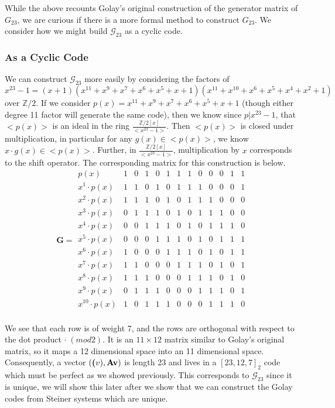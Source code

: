 \documentclass[paper=a4, fontsize=11pt]{scrartcl} %
\numberwithin{equation}{section} %
\numberwithin{figure}{section} %
\numberwithin{table}{section} %
\theoremstyle{break}
\begin{document}
While the above recounts Golay's original construction of the generator matrix of $G_{23}$, we are curious if there is a more formal method to construct $G_{23}$. We consider how we might build $\mathcal{G}_{23}$ as a cyclic code.

\subsubsection{As a Cyclic Code}
We can construct $\mathcal{G}_{23}$ more easily by considering the factors of $$x^{23}-1=(x+1)(x^{11}+x^9+x^7+x^6+x^5+x+1)(x^{11}+x^{10}+x^6+x^5+x^4+x^2+1)$$ over $\mathbb{Z}/2$. If we consider $p(x)=x^{11}+x^9+x^7+x^6+x^5+x+1$ (though either degree 11 factor will generate the same code), then we know since $p|x^{23}-1$, that $<p(x)>$ is an ideal in the ring $\frac{\mathbb{Z}/2[x]}{<x^{23}-1>}$. Then $<p(x)>$ is closed under multiplication, in particular for any $g(x)\in<p(x)>$, we know $x \cdot g(x)\in<p(x)>$. Further, in $\frac{\mathbb{Z}/2[x]}{<x^{23}-1>}$, multiplication by $x$ corresponds to the shift operator. The corresponding matrix for this construction is below.
$$\textbf{G} = \begin{array}{ccccccccccccc}
             p(x) & 1 & 0 & 1 & 0 & 1 & 1 & 1 & 0 & 0 & 0 & 1 & 1\\
   x^1 \cdot p(x) & 1 & 1 & 0 & 1 & 0 & 1 & 1 & 1 & 0 & 0 & 0 & 1\\
   x^2 \cdot p(x) & 1 & 1 & 1 & 0 & 1 & 0 & 1 & 1 & 1 & 0 & 0 & 0\\
   x^3 \cdot p(x) & 0 & 1 & 1 & 1 & 0 & 1 & 0 & 1 & 1 & 1 & 0 & 0\\
   x^4 \cdot p(x) & 0 & 0 & 1 & 1 & 1 & 0 & 1 & 0 & 1 & 1 & 1 & 0\\
   x^5 \cdot p(x) & 0 & 0 & 0 & 1 & 1 & 1 & 0 & 1 & 0 & 1 & 1 & 1\\
   x^6 \cdot p(x) & 1 & 0 & 0 & 0 & 1 & 1 & 1 & 0 & 1 & 0 & 1 & 1\\
   x^7 \cdot p(x) & 1 & 1 & 0 & 0 & 0 & 1 & 1 & 1 & 0 & 1 & 0 & 1\\
   x^8 \cdot p(x) & 1 & 1 & 1 & 0 & 0 & 0 & 1 & 1 & 1 & 0 & 1 & 0\\
   x^9 \cdot p(x) & 0 & 1 & 1 & 1 & 0 & 0 & 0 & 1 & 1 & 1 & 0 & 1\\
x^{10} \cdot p(x) & 1 & 0 & 1 & 1 & 1 & 0 & 0 & 0 & 1 & 1 & 1 & 0\\
\end{array}$$

We see that each row is of weight 7, and the rows are orthogonal with respect to the dot product $\cdot \; (mod 2)$. It is an $11 \times 12$ matrix similar to Golay's original matrix, so it maps a 12 dimensional space into an 11 dimensional space. Consequently, a vector $(\textbf(v), \textbf{Av})$ is length 23 and lives in a $[23,12,7]_2$ code which must be perfect as we showed previously. This corresponds to $\mathcal{G}_{23}$ since it is unique, we will show this later after we show that we can construct the Golay codes from Steiner systems which are unique.
\end{document}

